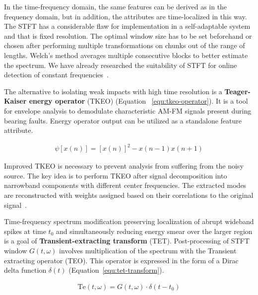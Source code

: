 In the time-frequency domain, the same features can be derived as in the frequency domain, but in addition, the attributes are time-localized in this way. The STFT has a considerable flaw for implementation in a self-adaptable system and that is fixed resolution. The optimal window size has to be set beforehand or chosen after performing multiple transformations on chunks out of the range of lengths. Welch's method averages multiple consecutive blocks to better estimate the spectrum. We have already researched the suitability of STFT for online detection of constant frequencies~\cite{hajek_iot_2022}.

The alternative to isolating weak impacts with high time resolution is a \textbf{Teager-Kaiser energy operator} (TKEO) (Equation~ \ref{equ:tkeo-operator}). It is a tool for envelope analysis to demodulate characteristic AM-FM signals present during bearing faults. Energy operator output can be utilized as a standalone feature attribute.

\begin{ceqn}\begin{align}
\psi[x(n)] = [x(n)]^2 - x(n - 1)x(n + 1)
\label{equ:tkeo-operator}
\end{align}\end{ceqn}

Improved TKEO is necessary to prevent analysis from suffering from the noisy source. The key idea is to perform TKEO after signal decomposition into narrowband components with different center frequencies. The extracted modes are reconstructed with weights assigned based on their correlations to the original signal~\cite{shi_application_2022}.

Time-frequency spectrum modification preserving localization of abrupt wideband spikes at time $t_0$ and simultaneously reducing energy smear over the larger region is a goal of \textbf{Transient-extracting transform} (TET). Post-processing of STFT window $G(t,\omega)$ involves multiplication of the spectrum with the Transient extracting operator (TEO). This operator is expressed in the form of a Dirac delta function $\delta(t)$ (Equation~\ref{equ:tet-transform}).

\begin{ceqn}\begin{align}
\mathrm{Te}(t,\omega) = G(t,\omega) \cdot  \delta(t - t_0)
\label{equ:tet-transform}
\end{align}\end{ceqn}

